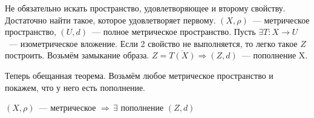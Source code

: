 \documentclass[document]{subfiles}
\begin{document}
\begin{remark}
    Не обязательно искать пространство, удовлетворяющее и второму свойству. Достаточно найти такое, которое удовлетворяет первому.
    $(X,\rho)$~--- метрическое пространство, $(U,d)$~--- полное метрическое пространство. Пусть $\exists T: X \rightarrow U$~--- изометрическое вложение. Если 2 свойство не выполняется, то легко такое $Z$ построить.
     Возьмём замыкание образа.
     $ Z = \overline{T(X)} \Rightarrow (Z,d)$~--- пополнение X.
\end{remark}
Теперь обещанная теорема. Возьмём любое метрическое пространство и покажем, что у него есть пополнение.
\begin{theorem}
    $(X, \rho)$~--- метрическое $\Rightarrow \, \exists$ пополнение $(Z,d)$
\end{theorem}
\end{document}
